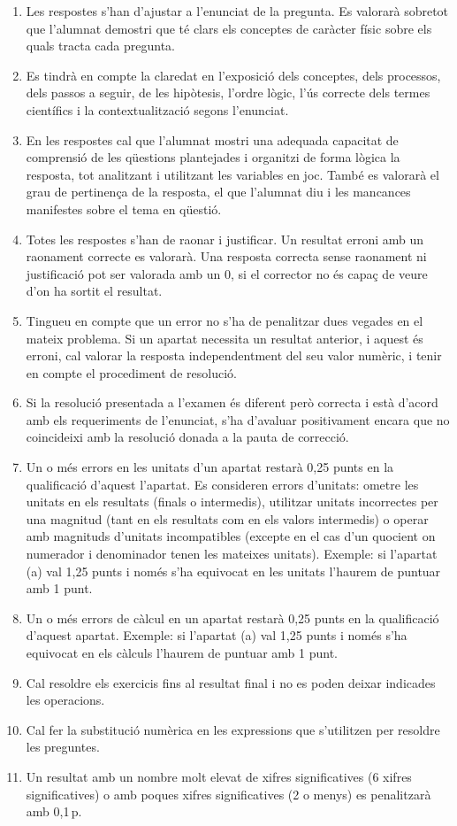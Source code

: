 \begin{enumerate}
  \item Les respostes s'han d'ajustar a l'enunciat de la pregunta. Es valorarà sobretot que l'alumnat demostri que té clars els conceptes de caràcter físic sobre els quals tracta cada pregunta.
  \item Es tindrà en compte la claredat en l'exposició dels conceptes, dels processos, dels passos a seguir, de les hipòtesis, l'ordre lògic, l'ús correcte dels termes científics i la contextualització segons l'enunciat.
  \item En les respostes cal que l'alumnat mostri una adequada capacitat de comprensió de les qüestions plantejades i organitzi de forma lògica la resposta, tot analitzant i utilitzant les variables en joc. També es valorarà el grau de pertinença de la resposta, el que l'alumnat diu i les mancances manifestes sobre el tema en qüestió.
  \item Totes les respostes s'han de raonar i justificar. Un resultat erroni amb un raonament correcte es valorarà. Una resposta correcta sense raonament ni justificació pot ser valorada amb un 0, si el corrector no és capaç de veure d'on ha sortit el resultat.
  \item Tingueu en compte que un error no s'ha de penalitzar dues vegades en el mateix problema. Si un apartat necessita un resultat anterior, i aquest és erroni, cal valorar la resposta independentment del seu valor numèric, i tenir en compte el procediment de resolució.
  \item Si la resolució presentada a l'examen és diferent però correcta i està d'acord amb els requeriments de l'enunciat, s'ha d'avaluar positivament encara que no coincideixi amb la resolució donada a la pauta de correcció.
  \item Un o més errors en les unitats d'un apartat restarà 0,25 punts en la qualificació d'aquest l'apartat. Es consideren errors d'unitats: ometre les unitats en els resultats (finals o intermedis), utilitzar unitats incorrectes per una magnitud (tant en els resultats com en els valors intermedis) o operar amb magnituds d'unitats incompatibles (excepte en el cas d'un quocient on numerador i denominador tenen les mateixes unitats). Exemple: si l'apartat (a) val 1,25 punts i només s'ha equivocat en les unitats l'haurem de puntuar amb 1 punt.
  \item Un o més errors de càlcul en un apartat restarà 0,25 punts en la qualificació d'aquest apartat. Exemple: si l'apartat (a) val 1,25 punts i només s'ha equivocat en els càlculs l'haurem de puntuar amb 1 punt.
  \item Cal resoldre els exercicis fins al resultat final i no es poden deixar indicades les operacions.
  \item Cal fer la substitució numèrica en les expressions que s'utilitzen per resoldre les preguntes.
  \item Un resultat amb un nombre molt elevat de xifres significatives (6 xifres significatives) o amb poques xifres significatives (2 o menys) es penalitzarà amb 0,1\,p.
\end{enumerate}
